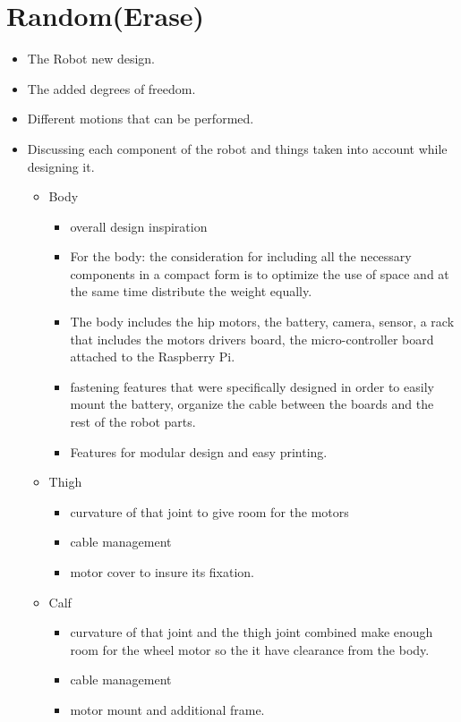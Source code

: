\chapter{Random(Erase)}

\graphicspath{{./Figures/Design}}


\begin{itemize}
	\item The Robot new design.
	\item The added degrees of freedom.
	\item Different motions that can be performed.
	\item Discussing each component of the robot and things taken into account while designing it.
	\begin{itemize}
		\item Body
		\begin{itemize}
		\item overall design inspiration
		\item For the body: the consideration for including all the necessary components in a compact form is to optimize the use of space and at the same time distribute the weight equally.
		\item The body includes the hip motors, the battery, camera, sensor, a rack that includes the motors drivers board, the micro-controller board attached to the Raspberry Pi.
		\item fastening features that were specifically designed in order to easily mount the battery, organize the cable between the boards and the rest of the robot parts.
		\item Features for modular design and easy printing.
		\end{itemize}
			\item Thigh
		\begin{itemize}
			\item curvature of that joint to give room for the motors 
			\item cable management 
			\item motor cover to insure its fixation. 
		\end{itemize}
			\item Calf
		\begin{itemize}
			\item curvature of that joint and the thigh joint combined make enough room for the wheel motor so the it have clearance from the body. 
			\item cable management 
			\item motor mount and additional frame.
		\end{itemize}
	\end{itemize}
\end{itemize}

